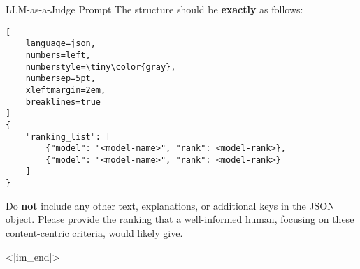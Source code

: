 \begin{promptbox}{LLM-as-a-Judge Prompt}
The structure should be \textbf{exactly} as follows:
\begin{lstlisting}[
    language=json,
    numbers=left,
    numberstyle=\tiny\color{gray},
    numbersep=5pt,
    xleftmargin=2em,
    breaklines=true
]
{
    "ranking_list": [
        {"model": "<model-name>", "rank": <model-rank>},
        {"model": "<model-name>", "rank": <model-rank>}
    ]
}
\end{lstlisting}

Do \textbf{not} include any other text, explanations, or additional keys in the JSON object.  
Please provide the ranking that a well-informed human, focusing on these content-centric criteria, would likely give.

\textless{}|im\_end|\textgreater{}
\end{promptbox}
